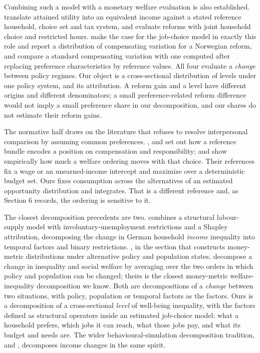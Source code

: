\documentclass[11pt,a4paper]{article}
\begin{document}
Combining such a model with a monetary welfare evaluation is also established. \citet{aaberge1995} translate attained utility into an equivalent income against a stated reference household, choice set and tax system, and \citet{aaberge2004} evaluate reforms with joint household choice and restricted hours. \citet{jiathoresen2021} make the case for the job-choice model in exactly this role and report a distribution of compensating variation for a Norwegian reform, and \citet{jacquet2026} compare a standard compensating variation with one computed after replacing preference characteristics by reference values. All four evaluate a \emph{change} between policy regimes. Our object is a cross-sectional distribution of levels under one policy system, and its attribution. A reform gain and a level have different origins and different denominators; a small preference-related reform difference would not imply a small preference share in our decomposition, and our shares do not estimate their reform gains.

The normative half draws on the literature that refuses to resolve interpersonal comparison by assuming common preferences. \citet{fleurbaeymaniquet2006}, \citet{fleurbaeymaniquet2017} and \citet{fleurbaeymaniquet2018} set out how a reference bundle encodes a position on compensation and responsibility; \citet{decosterhaan2015} and \citet{bargain2013} show empirically how much a welfare ordering moves with that choice. Their references fix a wage or an unearned-income intercept and maximize over a deterministic budget set. Ours fixes consumption across the alternatives of an estimated opportunity distribution and integrates. That is a different reference and, as Section 6 records, the ordering is sensitive to it.

The closest decomposition precedents are two. \citet{muehlhan2023} combines a structural labour-supply model with involuntary-unemployment restrictions and a Shapley attribution, decomposing the change in German household \emph{income} inequality into temporal factors and binary restrictions. \citet{creedyherault2011}, in the section that constructs money-metric distributions under alternative policy and population states, decompose a change in inequality and social welfare by averaging over the two orders in which policy and population can be changed; theirs is the closest money-metric welfare-inequality decomposition we know. Both are decompositions of a \emph{change} between two situations, with policy, population or temporal factors as the factors. Ours is a decomposition of a cross-sectional \emph{level} of well-being inequality, with the factors defined as structural operators inside an estimated job-choice model: what a household prefers, which jobs it can reach, what those jobs pay, and what its budget and needs are. The wider behavioural-simulation decomposition tradition, \citet{bargain2012} and \citet{jessen2019}, decomposes income changes in the same spirit.
\end{document}
